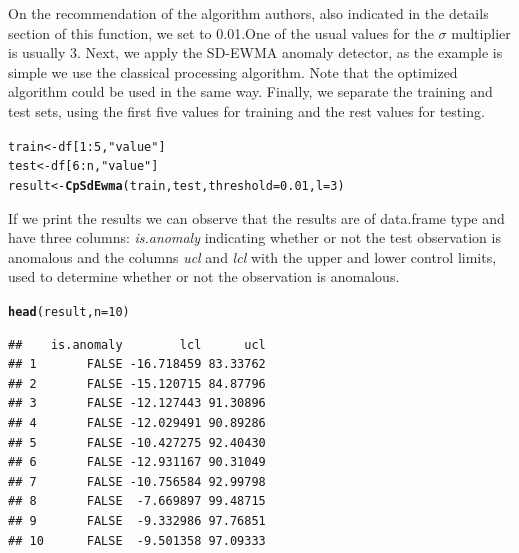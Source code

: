 \documentclass[a4paper]{article}\usepackage[]{graphicx}\usepackage[]{color}
\makeatletter
\newcommand{\hlnum}[1]{\textcolor[rgb]{0.686,0.059,0.569}{#1}}%
\newcommand{\hlstr}[1]{\textcolor[rgb]{0.192,0.494,0.8}{#1}}%
\newcommand{\hlopt}[1]{\textcolor[rgb]{0,0,0}{#1}}%
\newcommand{\hlstd}[1]{\textcolor[rgb]{0.345,0.345,0.345}{#1}}%
\newcommand{\hlkwb}[1]{\textcolor[rgb]{0.69,0.353,0.396}{#1}}%
\newcommand{\hlkwc}[1]{\textcolor[rgb]{0.333,0.667,0.333}{#1}}%
\newcommand{\hlkwd}[1]{\textcolor[rgb]{0.737,0.353,0.396}{\textbf{#1}}}%
\newenvironment{kframe}{%
 \def\at@end@of@kframe{}%
 \ifinner\ifhmode%
  \def\at@end@of@kframe{\end{minipage}}%
  \begin{minipage}{\columnwidth}%
 \fi\fi%
 \def\FrameCommand##1{\hskip\@totalleftmargin \hskip-\fboxsep
 \colorbox{shadecolor}{##1}\hskip-\fboxsep
     \hskip-\linewidth \hskip-\@totalleftmargin \hskip\columnwidth}%
 \MakeFramed {\advance\hsize-\width
   \@totalleftmargin\z@ \linewidth\hsize
   \@setminipage}}%
 {\par\unskip\endMakeFramed%
 \at@end@of@kframe}
\newenvironment{knitrout}{}{} %
\makeatother
\begin{document}
On the recommendation of the algorithm authors, also indicated in the details section of this function, we set  to 0.01.One of the usual values for the $\sigma$ multiplier  is usually 3. Next, we apply the SD-EWMA anomaly detector, as the example is simple we use the classical processing algorithm. Note that the optimized algorithm could be used in the same way. Finally, we separate the training and test sets, using the first five values for training and the rest values for testing.

\begin{knitrout}
\color{fgcolor}\begin{kframe}
\begin{alltt}
\hlstd{train} \hlkwb{<-} \hlstd{df[}\hlnum{1}\hlopt{:}\hlnum{5}\hlstd{,}\hlstr{"value"}\hlstd{]}
\hlstd{test} \hlkwb{<-} \hlstd{df[}\hlnum{6}\hlopt{:}\hlstd{n,}\hlstr{"value"}\hlstd{]}
\hlstd{result} \hlkwb{<-} \hlkwd{CpSdEwma}\hlstd{(train, test,} \hlkwc{threshold} \hlstd{=} \hlnum{0.01}\hlstd{,} \hlkwc{l} \hlstd{=} \hlnum{3}\hlstd{)}
\end{alltt}
\end{kframe}
\end{knitrout}

If we print the results we can observe that the results are of data.frame type and have three columns: \emph{is.anomaly} indicating whether or not the test observation is anomalous and the columns \emph{ucl} and \emph{lcl} with the upper and lower control limits, used to determine whether or not the observation is anomalous.

\begin{knitrout}
\color{fgcolor}\begin{kframe}
\begin{alltt}
\hlkwd{head}\hlstd{(result,} \hlkwc{n} \hlstd{=} \hlnum{10}\hlstd{)}
\end{alltt}
\begin{verbatim}
##    is.anomaly        lcl      ucl
## 1       FALSE -16.718459 83.33762
## 2       FALSE -15.120715 84.87796
## 3       FALSE -12.127443 91.30896
## 4       FALSE -12.029491 90.89286
## 5       FALSE -10.427275 92.40430
## 6       FALSE -12.931167 90.31049
## 7       FALSE -10.756584 92.99798
## 8       FALSE  -7.669897 99.48715
## 9       FALSE  -9.332986 97.76851
## 10      FALSE  -9.501358 97.09333
\end{verbatim}
\end{kframe}
\end{knitrout}
\end{document}
